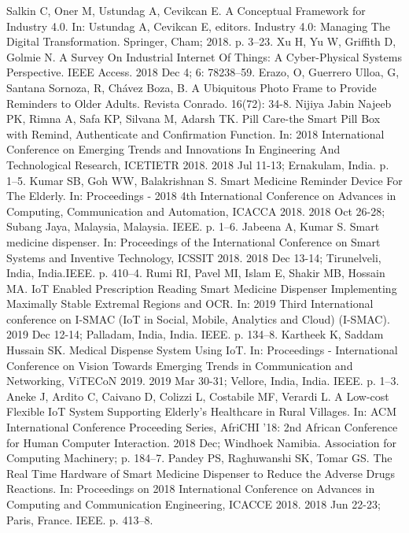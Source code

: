 \documentclass{IOS-Book-Article}
\begin{document}
\begin{thebibliography}{99}
Salkin C, Oner M, Ustundag A, Cevikcan E. A Conceptual Framework for Industry 4.0. In: Ustundag A, Cevikcan E, editors. Industry 4.0: Managing The Digital Transformation. Springer, Cham; 2018. p. 3–23.
Xu H, Yu W, Griffith D, Golmie N. A Survey On Industrial Internet Of Things: A Cyber-Physical Systems Perspective. IEEE Access. 2018 Dec 4; 6: 78238–59.
Erazo, O, Guerrero Ulloa, G, Santana Sornoza, R, Chávez Boza, B. A Ubiquitous Photo Frame to Provide Reminders to Older Adults. Revista Conrado. 16(72): 34-8.
Nijiya Jabin Najeeb PK, Rimna A, Safa KP, Silvana M, Adarsh TK. Pill Care-the Smart Pill Box with Remind, Authenticate and Confirmation Function. In: 2018 International Conference on Emerging Trends and Innovations In Engineering And Technological Research, ICETIETR 2018. 2018 Jul 11-13; Ernakulam, India. p. 1–5.
Kumar SB, Goh WW, Balakrishnan S. Smart Medicine Reminder Device For The Elderly. In: Proceedings - 2018 4th International Conference on Advances in Computing, Communication and Automation, ICACCA 2018. 2018 Oct 26-28; Subang Jaya, Malaysia, Malaysia. IEEE. p. 1–6.
Jabeena A, Kumar S. Smart medicine dispenser. In: Proceedings of the International Conference on Smart Systems and Inventive Technology, ICSSIT 2018. 2018 Dec 13-14; Tirunelveli, India, India.IEEE. p. 410–4.
Rumi RI, Pavel MI, Islam E, Shakir MB, Hossain MA. IoT Enabled Prescription Reading Smart Medicine Dispenser Implementing Maximally Stable Extremal Regions and OCR. In: 2019 Third International conference on I-SMAC (IoT in Social, Mobile, Analytics and Cloud) (I-SMAC). 2019 Dec 12-14; Palladam, India, India. IEEE. p. 134–8.
Kartheek K, Saddam Hussain SK. Medical Dispense System Using IoT. In: Proceedings - International Conference on Vision Towards Emerging Trends in Communication and Networking, ViTECoN 2019. 2019 Mar 30-31; Vellore, India, India. IEEE. p. 1–3. 
Aneke J, Ardito C, Caivano D, Colizzi L, Costabile MF, Verardi L. A Low-cost Flexible IoT System Supporting Elderly’s Healthcare in Rural Villages. In: ACM International Conference Proceeding Series, AfriCHI '18: 2nd African Conference for Human Computer Interaction. 2018 Dec; Windhoek Namibia. Association for Computing Machinery; p. 184–7.
Pandey PS, Raghuwanshi SK, Tomar GS. The Real Time Hardware of Smart Medicine Dispenser to Reduce the Adverse Drugs Reactions. In: Proceedings on 2018 International Conference on Advances in Computing and Communication Engineering, ICACCE 2018. 2018 Jun 22-23; Paris, France. IEEE. p. 413–8.

\end{thebibliography}
\end{document}
